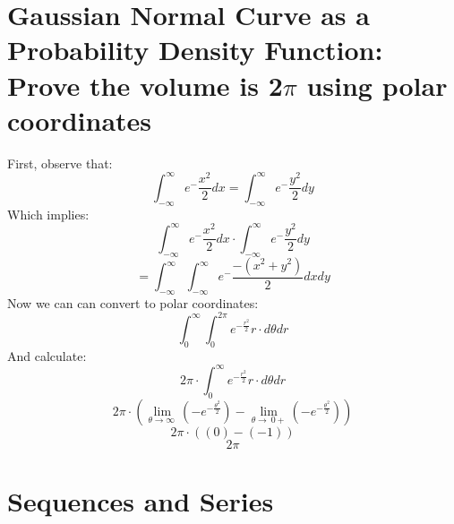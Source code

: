 \documentclass{article}
\begin{document}
\section{Gaussian Normal Curve as a Probability Density Function: Prove the volume is 2$\pi$ using polar coordinates}
First, observe that:
\[ \int_{-\infty}^{\infty} e^-\frac{x^2}{2} dx = \int_{-\infty}^{\infty} e^-\frac{y^2}{2} dy\]
Which implies:
\[ \int_{-\infty}^{\infty} e^-\frac{x^2}{2} dx \cdot \int_{-\infty}^{\infty} e^-\frac{y^2}{2} dy \]
\[ = \int_{-\infty}^{\infty} \int_{-\infty}^{\infty} e^-\frac{-(x^2+y^2)}{2} dx dy \]
Now we can can convert to polar coordinates:
\[ \int_{0}^{\infty} \int_{0}^{2\pi} e^{-\frac{r^2}{2}} r \cdot d\theta dr \]
And calculate:
\[ 2\pi \cdot \int_{0}^{\infty} e^{-\frac{r^2}{2}} r \cdot d\theta dr\]
\[ 2\pi \cdot (\lim _{\theta \to \infty \:}\left(-e^{-\frac{\theta ^2}{2}}\right) - \lim _{\theta \to \:0+}\left(-e^{-\frac{\theta ^2}{2}}\right))\]
\[ 2\pi \cdot ((0)-\left(-1\right))\]
\[ 2\pi\]

\section{Sequences and Series}
\end{document}

